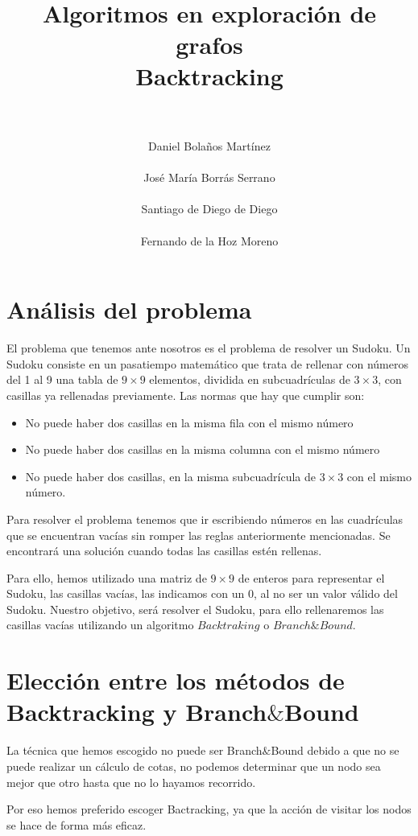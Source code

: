 \documentclass[11pt, a4paper]{article}
\title{
  \normalfont \normalsize 
  \textsc{} \\ [25pt]    %
  \horrule{0.5pt} \\[0.4cm] %
  \huge Algoritmos en exploración de grafos\\ \Large{Backtracking}\\ %
  \horrule{2pt} \\[0.5cm] %
}
\author{\Large{Daniel Bolaños Martínez} 
\\\\
\Large{José María Borrás Serrano}
\\\\
\Large{Santiago de Diego de Diego}
\\\\
\Large{Fernando de la Hoz Moreno}}
\date{\vspace{-1.5em} \normalsize }
\theoremstyle{theorem-style}
\theoremstyle{definition-style}
\theoremstyle{remark-style}
\theoremstyle{example-style}
\begin{document}
\maketitle  %
\vfill
\begin{center}
\end{center}
\newpage
\newpage

\section{Análisis del problema}
El problema que tenemos ante nosotros es el problema de resolver un Sudoku. Un Sudoku consiste en un pasatiempo matemático que trata de rellenar con números del 1 al 9 una tabla de $9\times 9$ elementos, dividida en subcuadrículas de $3\times 3$, con casillas ya rellenadas previamente. Las normas que hay que cumplir son:
\begin{itemize}
\item No puede haber dos casillas en la misma fila con el mismo número
\item No puede haber dos casillas en la misma columna con el mismo número
\item No puede haber dos casillas, en la misma subcuadrícula de $3 \times 3$ con el mismo número.
\end{itemize}
Para resolver el problema tenemos que ir escribiendo números en las cuadrículas que se encuentran vacías sin romper las reglas anteriormente mencionadas. Se encontrará una solución cuando todas las casillas estén rellenas.

Para ello, hemos utilizado una matriz de $9 \times 9$ de enteros para representar el Sudoku, las casillas vacías, las indicamos con un 0, al no ser un valor válido del Sudoku. Nuestro objetivo, será resolver el Sudoku, para ello rellenaremos las casillas vacías utilizando un algoritmo $Backtraking$ o $Branch \& Bound$.

\section{Elección entre los métodos de Backtracking y Branch$\&$Bound}

La técnica que hemos escogido no puede ser Branch$\&$Bound debido a que no se puede realizar un cálculo de cotas, no podemos determinar que un nodo sea mejor que otro hasta que no lo hayamos recorrido.

Por eso hemos preferido escoger Bactracking, ya que la acción de visitar los nodos se hace de forma más eficaz.
\end{document}
